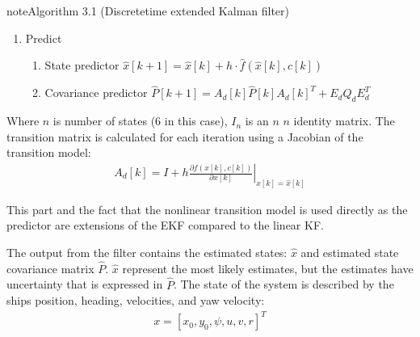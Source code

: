 \documentclass[review]{elsarticle}
\begin{document}
\begin{sphinxadmonition}{note}{Algorithm 3.1 (Discrete\sphinxhyphen{}time extended Kalman filter)}
\begin{enumerate}
\begin{enumerate}
\begin{enumerate}
\item {} 
  
Covariance corrector
\(\hat{P}[k] = I_{KC} \cdot \hat{P}[k] I_{KC}^T + K[k] R_d K^T \)

\end{enumerate}

\item {} 
  
Predict
\begin{enumerate}
%
\item {} 
  
State predictor
\(\hat{x}[k+1] = \hat{x}[k] + h \cdot \hat{f}(\hat{x}[k], c[k])\)

\item {} 
  
Covariance predictor
\(\hat{P}[k+1] = A_d[k]  \hat{P}[k] A_d[k]^T + E_d Q_d E_d^T \)

\end{enumerate}

\end{enumerate}

\end{enumerate}
\end{sphinxadmonition}

  
Where \(n\) is number of states (6 in this case), \(I_n\) is an \(n\) \cdot \(n\) identity matrix.
The transition matrix is calculated for each iteration using a Jacobian of the transition model:
\begin{equation}\label{equation:04.01_EK:eqjacobi}
\begin{split}A_d[k] = I + h \left. \frac{\partial f \left(x[k],c[k] \right)}{\partial x[k]} \right|_{x[k]=\hat{x}[k]}\end{split}
\end{equation}
  
This part and the fact that the nonlinear transition model is used directly as the predictor are extensions of the EKF compared to the linear KF.

  
The output from the filter contains the estimated states: \(\hat{x}\) and estimated state covariance matrix \(\hat{P}\). \(\hat{x}\) represent the most likely estimates, but the estimates have uncertainty that is expressed in \(\hat{P}\).
The state of the system is described by the ships position, heading, velocities, and yaw velocity:
\begin{equation}\label{equation:04.01_EK:eqstates}
\begin{split}x = [x_0,y_0,\psi,u,v,r]^T\end{split}
\end{equation}
  
\end{document}
